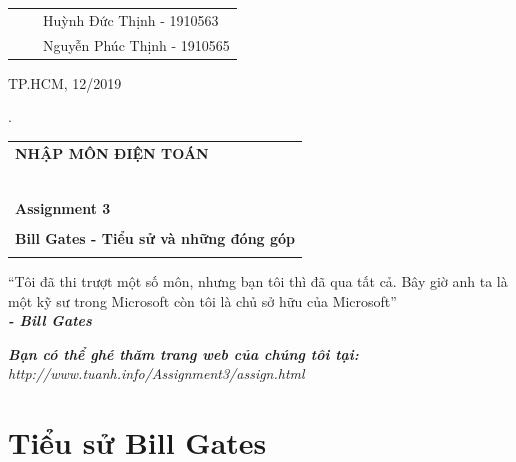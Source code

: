 \documentclass[12pt,a4paper]{article}  %
\begin{document}
\begin{titlepage}
\begin{table}[h]
\begin{tabular}{rrl}
	& & Huỳnh Đức Thịnh - 1910563 \\
	& & Nguyễn Phúc Thịnh - 1910565 \\
	
	\end{tabular}
	\end{table}
	\vspace{4cm}
	\begin{center}
	{\footnotesize TP.HCM, 12/2019}
	\end{center}
	\end{titlepage}
	\newpage


	\noindent .
	\vspace{6cm}
	
	
	\begin{center}
	\begin{tabular}{c}
	\multicolumn{1}{l}{\textbf{{\Large NHẬP MÔN ĐIỆN TOÁN}}}\\
	~~\\
	\hline
	\\
	\multicolumn{1}{l}{\textbf{{\Large Assignment 3}}}\\
	\\
	\textbf{\Huge Bill Gates - Tiểu sử và những đóng góp}\\
	\\
	\hline
	\end{tabular}
	\end{center}

	\vspace{5cm}

	\begin{center}
	\enquote{Tôi đã thi trượt một số môn, nhưng bạn tôi thì đã qua tất cả. Bây giờ anh ta là một kỹ sư trong Microsoft còn tôi là chủ sở hữu của Microsoft}
	\\
	\noindent \textbf{\textit{- Bill Gates}}
	\end{center}

	\newpage

 \textit{{\Large\tableofcontents}}
 \vspace{3cm}


 \noindent \textit{\footnotesize \textbf{Bạn có thể ghé thăm trang web của chúng tôi tại:} http://www.tuanh.info/Assignment3/assign.html}

 \newpage

 \section{Tiểu sử Bill Gates} 
\end{document}
